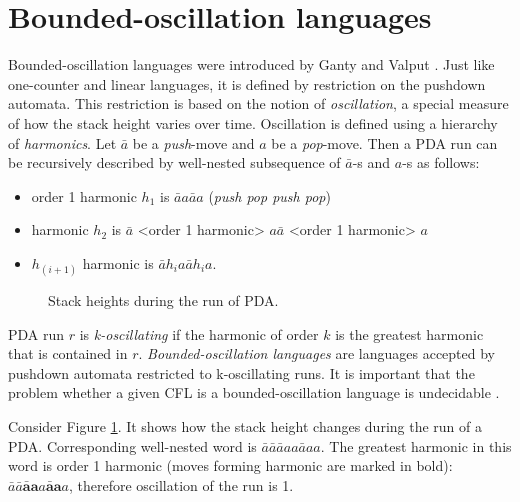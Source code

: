 \section{Bounded-oscillation languages}
\label{sec:osc}
Bounded-oscillation languages were introduced by Ganty and Valput \cite{BoundOsc}. Just like one-counter and linear languages, it is defined by restriction on the pushdown automata. This restriction is based on the notion of \textit{oscillation}, a special measure of how the stack height varies over time. Oscillation is defined using a hierarchy of \textit{harmonics}. Let $\bar{a}$ be a \textit{push}-move and $a$ be a \textit{pop}-move. Then a PDA run can be recursively described by well-nested subsequence of $\bar{a}$-s and $a$-s as follows:
\begin{itemize}
\item  order 1 harmonic $h_1$ is $\bar{a}a\bar{a}a$ (\textit{push pop push pop})
\item  harmonic $h_2$ is $\bar{a}$ <order 1 harmonic> $a\bar{a}$ <order 1 harmonic> $a$
\item  $h_{(i+1)}$ harmonic is $\bar{a}h_ia\bar{a}h_ia$.
\end{itemize}
\begin{figure}
\caption{Stack heights during the run of PDA.}
\label{oscb}
\end{figure}


PDA run $r$ is \textit{k-oscillating} if the harmonic of order $k$ is the greatest harmonic that is contained in $r$. \textit{Bounded-oscillation languages} are languages accepted by pushdown automata restricted to k-oscillating runs. It is important that the problem whether a given CFL is a bounded-oscillation language is undecidable \cite{BoundOsc}.
\begin{example}
Consider Figure \ref{oscb}. It shows how the stack height changes during the run of a PDA. Corresponding well-nested word is $\bar{a}\bar{a}\bar{a}aa\bar{a}aa$. The greatest harmonic in this word is order 1 harmonic (moves forming harmonic are marked in bold): $\bar{a}\bar{a}\mathbf{\bar{a}a}a\mathbf{\bar{a}a}a$, therefore oscillation of the run is 1.
\end{example}


